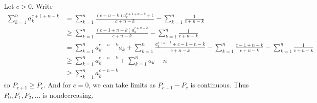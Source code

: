 Let $c>0$. Write
\begin{align*}
	\sum_{k=1}^na_k^{c+1+n-k}&=\sum_{k=1}^n\frac{(c+n-k)a_k^{c+1+n-k}+1}{c+n-k}-\sum_{k=1}^n\frac{1}{c+n-k}\\
	&\geq\sum_{k=1}^n\frac{(c+1+n-k)a_k^{c+n-k}}{c+n-k}-\sum_{k=1}^n\frac{1}{c+n-k}\\
	&=\sum_{k=1}^na_k^{c+n-k}a_k+\sum_{k=1}^n\frac{a_k^{c+n-k}+c-1+n-k}{c+n-k}-\sum_{k=1}^n\frac{c-1+n-k}{c+n-k}-\sum_{k=1}^n\frac{1}{c+n-k}\\
	&\geq\sum_{k=1}^na_k^{c+n-k}+\sum_{k=1}^na_k-n\\
	&\geq\sum_{k=1}^na_k^{c+n-k}
\end{align*}
so $P_{c+1}\geq P_c$. And for $c=0$, we can take limits as $P_{c+1}-P_c$ is continuous. Thus $P_0,P_1,P_2,\ldots$ is nondecreasing.